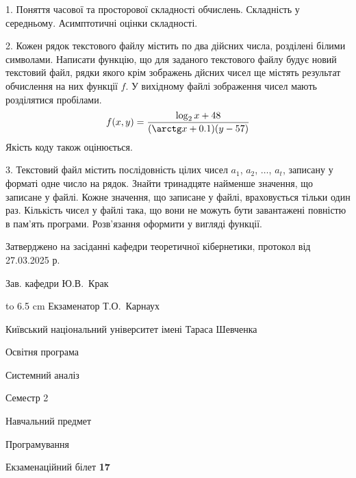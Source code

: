\documentclass[12pt, ukrainian]{article}
\begin{document}
{%
1. Поняття часової та просторової складності обчислень. Складність у середньому. Асимптотичні оцінки складності.%
\par
\vspace{2mm}

2. Кожен рядок текстового файлу містить по два дійсних числа, розділені білими символами.
Написати функцію, що для заданого текстового файлу будує новий текстовий файл, рядки якого крім зображень дйсних чисел ще містять результат обчислення на них функції $f$. У вихідному файлі зображення чисел мають розділятися пробілами. 
$$f(x, y) =\frac{\log_{2} x + 48}{(\arctg x + 0.1) (y - 57)}$$ 
Якість коду також оцінюється.

\par
\vspace{2mm}

3. Текстовий файл містить послідовність цілих чисел $a_1$, $a_2$, $\ldots$, $a_t$, записану у форматі одне число на рядок. Знайти тринадцяте найменше значення, що записане у файлі. Кожне значення, що записане у файлі, враховується тільки один раз. Кількість чисел у файлі така, що вони не можуть бути завантажені повністю в пам'ять програми. Розв'язання оформити у вигляді функції.

}
{\smallskip\smallskip \begin {scriptsize} Затверджено на засіданні кафедри теоретичної кібернетики, протокол   від   27.03.2025 р.\par\smallskip\smallskip\smallskip\smallskip
{\parbox {6.5 cm} {Зав. кафедри \dotfill Ю.В.~Крак}}\hspace {0.7cm} {\hbox to 6.5 cm { Екзаменатор \dotfill Т.О.~Карнаух}} \end{scriptsize}}
\newpage
{{\begin {scriptsize}\par
{ \center  Київський національний університет імені Тараса Шевченка \par}
{\parbox {5 cm}{Освітня програма \hfill}{\parbox {7 cm}{Системний аналіз\hfill}}\parbox {6 cm}{\hfill Семестр 2}}\par
{\parbox {5 cm} {Навчальний предмет \hfill}\parbox {7 cm}{Програмування \hfill}\parbox {6cm}{\hfill}\par}\vspace{-15pt} \end{scriptsize}}{\center Екзаменаційний білет \No \textbf { 17 }\par}}
\end{document}
